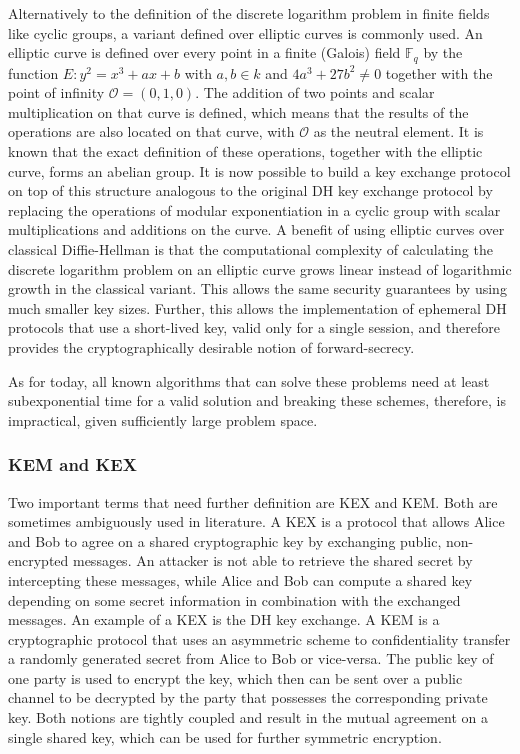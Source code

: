 Alternatively to the definition of the discrete logarithm problem in finite fields like cyclic groups, a variant defined over elliptic curves is commonly used. An elliptic curve is defined over every point in a finite (Galois) field \(\mathbb{F}_q\) by the function \(E: y^2 = x^3 + ax +b\) with \(a,b \in k \) and \(4a^3 +27b^2 \neq 0\) together with the point of infinity \(\mathcal{O} = (0,1,0)\). The addition of two points and scalar multiplication on that curve is defined, which means that the results of the operations are also located on that curve, with \(\mathcal{O}\) as the neutral element. It is known that the exact definition of these operations, together with the elliptic curve, forms an abelian group. It is now possible to build a key exchange protocol on top of this structure analogous to the original \ac{DH} key exchange protocol by replacing the operations of modular exponentiation in a cyclic group with scalar multiplications and additions on the curve. A benefit of using elliptic curves over classical Diffie-Hellman is that the computational complexity of calculating the discrete logarithm problem on an elliptic curve grows linear instead of logarithmic growth in the classical variant. This allows the same security guarantees by using much smaller key sizes. Further, this allows the implementation of ephemeral \ac{DH} protocols that use a short-lived key, valid only for a single session, and therefore provides the cryptographically desirable notion of forward-secrecy.

As for today, all known algorithms that can solve these problems need at least subexponential time for a valid solution and breaking these schemes, therefore, is impractical, given sufficiently large problem space.

\subsubsection{\texorpdfstring{\acs{KEM}}{KEM} and \texorpdfstring{\acs{KEX}}{KEX}}
Two important terms that need further definition are \ac{KEX} and \ac{KEM}. Both are sometimes ambiguously used in literature. A \ac{KEX} is a protocol that allows Alice and Bob to agree on a shared cryptographic key by exchanging public, non-encrypted messages. An attacker is not able to retrieve the shared secret by intercepting these messages, while Alice and Bob can compute a shared key depending on some secret information in combination with the exchanged messages. An example of a \ac{KEX} is the \ac{DH} key exchange. A \ac{KEM} is a cryptographic protocol that uses an asymmetric scheme to confidentiality transfer a randomly generated secret from Alice to Bob or vice-versa. The public key of one party is used to encrypt the key, which then can be sent over a public channel to be decrypted by the party that possesses the corresponding private key. Both notions are tightly coupled and result in the mutual agreement on a single shared key, which can be used for further symmetric encryption.


